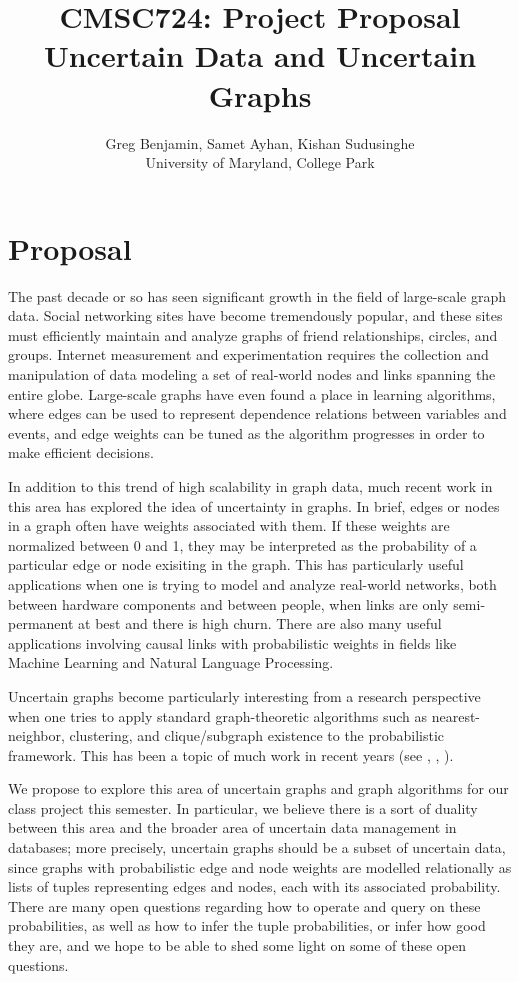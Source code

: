 \documentclass{article}
\title{CMSC724: Project Proposal \\
Uncertain Data and Uncertain Graphs}
\author{Greg Benjamin, Samet Ayhan, Kishan Sudusinghe \\
University of Maryland, College Park}
\begin{document}
\maketitle

\section{Proposal}

The past decade or so has seen significant growth in the field of 
large-scale graph data.  Social networking sites have become tremendously
popular, and these sites must efficiently maintain and analyze graphs of
friend relationships, circles, and groups.  Internet measurement and 
experimentation requires the collection and manipulation of data
modeling a set of real-world nodes and links spanning the entire globe.
Large-scale graphs have even found a place in learning algorithms,
where edges can be used to represent dependence relations between
variables and events, and edge weights can be tuned as the algorithm
progresses in order to make efficient decisions.

In addition to this trend of high scalability in graph data, much recent work
in this area has explored the idea of uncertainty in graphs.  In brief, 
edges or nodes in a graph often have weights associated with them.  If these
weights are normalized between 0 and 1, they may be interpreted as the
probability of a particular edge or node exisiting in the graph.  This has
particularly useful applications when one is trying to model and analyze
real-world networks, both between hardware components and between people,
when links are only semi-permanent at best and there is high churn.  There
are also many useful applications involving causal links with probabilistic
weights in fields like Machine Learning and Natural Language Processing.

Uncertain graphs become particularly interesting from a research perspective
when one tries to apply standard graph-theoretic algorithms such as
nearest-neighbor, clustering, and clique/subgraph existence to the
probabilistic framework.  This has been a topic of much work in recent years
(see \cite{ref:continuous-subgraph}, \cite{ref:nearest-neighbors}, 
\cite{ref:freq-subgraphs}).

We propose to explore this area of uncertain graphs and graph algorithms for
our class project this semester.  In particular, we believe there is a sort
of duality between this area and the broader area of uncertain data management
in databases; more precisely, uncertain graphs should be a subset of uncertain
data, since graphs with probabilistic edge and node weights are modelled
relationally as lists of tuples representing edges and nodes, each with its
associated probability.  There are many open questions regarding how to
operate and query on these probabilities, as well as how to infer the tuple
probabilities, or infer how good they are, and we hope to be able to shed
some light on some of these open questions.
\end{document}
